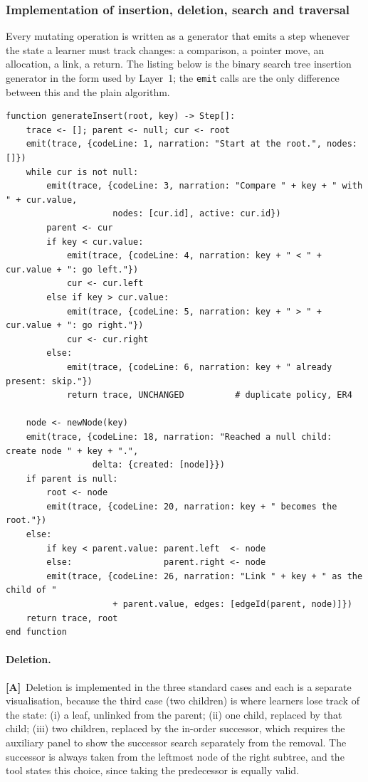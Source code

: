 \documentclass[11pt,a4paper]{article}
\newcommand{\A}{\textcolor{asmc}{\textbf{[A]}}}     %
\newcommand{\ct}[1]{\texttt{#1}}
\begin{document}
\subsubsection{Implementation of insertion, deletion, search and traversal}

Every mutating operation is written as a generator that emits a step whenever the state a
learner must track changes: a comparison, a pointer move, an allocation, a link, a return.
The listing below is the binary search tree insertion generator in the form used by
Layer~1; the \ct{emit} calls are the only difference between this and the plain algorithm.

\begin{lstlisting}[style=pseudo,caption={BST insertion, iterative, instrumented. Emitting a
step at every comparison is what allows the code panel and the auxiliary panel to advance in
lockstep with the tree.},label={lst:bstinsert}]
function generateInsert(root, key) -> Step[]:
    trace <- []; parent <- null; cur <- root
    emit(trace, {codeLine: 1, narration: "Start at the root.", nodes: []})
    while cur is not null:
        emit(trace, {codeLine: 3, narration: "Compare " + key + " with " + cur.value,
                     nodes: [cur.id], active: cur.id})
        parent <- cur
        if key < cur.value:
            emit(trace, {codeLine: 4, narration: key + " < " + cur.value + ": go left."})
            cur <- cur.left
        else if key > cur.value:
            emit(trace, {codeLine: 5, narration: key + " > " + cur.value + ": go right."})
            cur <- cur.right
        else:
            emit(trace, {codeLine: 6, narration: key + " already present: skip."})
            return trace, UNCHANGED          # duplicate policy, ER4

    node <- newNode(key)
    emit(trace, {codeLine: 18, narration: "Reached a null child: create node " + key + ".",
                 delta: {created: [node]}})
    if parent is null:
        root <- node
        emit(trace, {codeLine: 20, narration: key + " becomes the root."})
    else:
        if key < parent.value: parent.left  <- node
        else:                  parent.right <- node
        emit(trace, {codeLine: 26, narration: "Link " + key + " as the child of "
                     + parent.value, edges: [edgeId(parent, node)]})
    return trace, root
end function
\end{lstlisting}

\paragraph{Deletion.} \A\ Deletion is implemented in the three standard cases and each is a
separate visualisation, because the third case (two children) is where learners lose track
of the state: (i) a leaf, unlinked from the parent; (ii) one child, replaced by that child;
(iii) two children, replaced by the in-order successor, which requires the auxiliary panel
to show the successor search separately from the removal. The successor is always taken from
the leftmost node of the right subtree, and the tool states this choice, since taking the
predecessor is equally valid.
\end{document}
